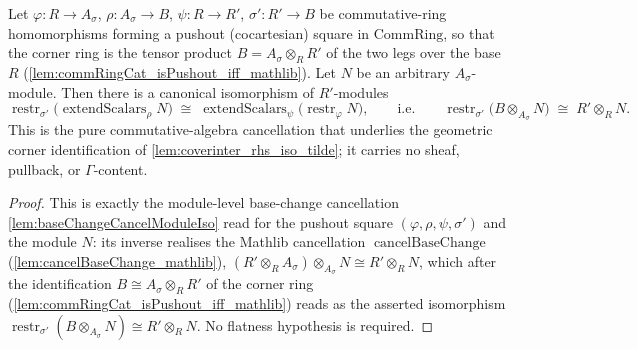 \begin{lemma}

  \label{lem:coverinter_baseChanged_module_iso_tensor}
  Let \(\varphi : R \to A_\sigma\), \(\rho : A_\sigma \to B\), \(\psi : R \to R'\),
  \(\sigma' : R' \to B\) be commutative-ring homomorphisms forming a pushout (cocartesian)
  square in \(\mathrm{CommRing}\), so that the corner ring is the tensor product
  \(B = A_\sigma \otimes_R R'\) of the two legs over the base \(R\)
  (\cref{lem:commRingCat_isPushout_iff_mathlib}). Let \(N\) be an arbitrary
  \(A_\sigma\)-module. Then there is a canonical isomorphism of \(R'\)-modules
  \[
    \operatorname{restr}_{\sigma'}\bigl(\operatorname{extendScalars}_\rho N\bigr)
      \;\cong\;
    \operatorname{extendScalars}_\psi\bigl(\operatorname{restr}_\varphi N\bigr),
    \qquad\text{i.e.}\qquad
    \operatorname{restr}_{\sigma'}\bigl(B \otimes_{A_\sigma} N\bigr)
      \;\cong\; R' \otimes_R N.
  \]
  This is the pure commutative-algebra cancellation that underlies the geometric corner
  identification of \cref{lem:coverinter_rhs_iso_tilde}; it carries no sheaf, pullback, or
  \(\Gamma\)-content.
\end{lemma}
\begin{proof}
  This is exactly the module-level base-change cancellation \cref{lem:baseChangeCancelModuleIso}
  read for the pushout square \((\varphi, \rho, \psi, \sigma')\) and the module \(N\): its
  inverse realises the Mathlib cancellation \(\operatorname{cancelBaseChange}\)
  (\cref{lem:cancelBaseChange_mathlib}),
  \((R' \otimes_R A_\sigma) \otimes_{A_\sigma} N \cong R' \otimes_R N\), which after the
  identification \(B \cong A_\sigma \otimes_R R'\) of the corner ring
  (\cref{lem:commRingCat_isPushout_iff_mathlib}) reads as the asserted isomorphism
  \(\operatorname{restr}_{\sigma'}(B \otimes_{A_\sigma} N) \cong R' \otimes_R N\). No flatness
  hypothesis is required.
\end{proof}

